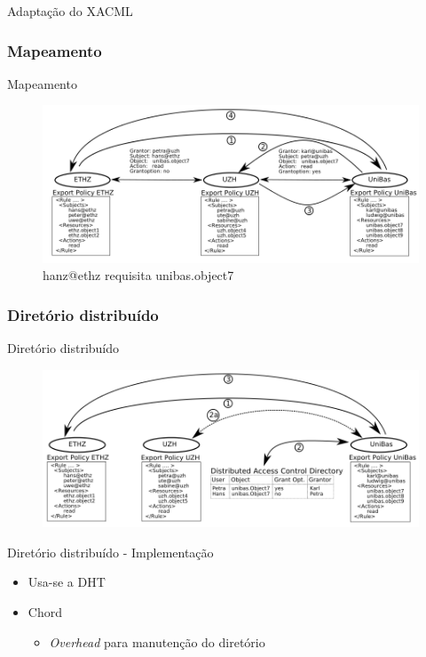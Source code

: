 \documentclass{beamer}
\begin{document}
\begin{frame}[plain]{Adaptação do XACML}

\end{frame}

\subsubsection{Mapeamento}
  \begin{frame}{Mapeamento}
   \begin{figure}[H]
    \includegraphics[scale=0.3]{demap_fig2_mp.png}
    \caption{hanz@ethz requisita unibas.object7}
   \end{figure}

  \end{frame}


\subsubsection{Diretório distribuído}
  \begin{frame}{Diretório distribuído}
   \begin{figure}[H]
    \includegraphics[scale=0.3]{demap_fig3_dd.png}
   \end{figure}

  \end{frame}
  
  \begin{frame}{Diretório distribuído - Implementação}
    \begin{itemize}
     \item Usa-se a DHT
     \item Chord
     \begin{itemize}
      \item \textit{Overhead} para manutenção do diretório
     \end{itemize}

    \end{itemize}

  \end{frame}
  
\end{document}
